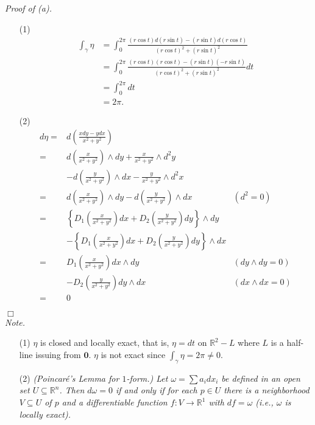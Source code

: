 \documentclass{article}
\begin{document}
\emph{Proof of (a).}
\begin{enumerate}
\item[(1)]
  \begin{align*}
    \int_{\gamma} \eta
    &= \int_{0}^{2\pi}
      \frac{(r\cos t) d(r\sin t) - (r\sin t) d(r\cos t)}{(r\cos t)^2 + (r\sin t)^2} \\
    &= \int_{0}^{2\pi}
      \frac{(r \cos t)(r \cos t) - (r\sin t) (-r\sin t)}{(r\cos t)^2 + (r\sin t)^2} dt \\
    &= \int_{0}^{2\pi} dt \\
    &= 2\pi.
  \end{align*}

\item[(2)]
  \begin{align*}
    d \eta
    =& d \left( \frac{x dy - y dx}{x^2+y^2} \right) \\
    =& d \left( \frac{x}{x^2+y^2} \right) \wedge dy
      + \frac{x}{x^2+y^2} \wedge {d^2y} \\
      &- d \left( \frac{y}{x^2+y^2} \right) \wedge dx
      - \frac{y}{x^2+y^2} \wedge {d^2x} \\
    =& d \left( \frac{x}{x^2+y^2} \right) \wedge dy
      - d \left( \frac{y}{x^2+y^2} \right) \wedge dx
      &(d^2 = 0) \\
    =& \left\{ D_1\left(\frac{x}{x^2+y^2}\right) dx
      + D_2\left(\frac{y}{x^2+y^2}\right) dy \right\} \wedge dy \\
      &- \left\{ D_1\left(\frac{x}{x^2+y^2}\right) dx
      + D_2\left(\frac{y}{x^2+y^2}\right) dy \right\} \wedge dx \\
    =& D_1\left(\frac{x}{x^2+y^2}\right) dx \wedge dy
      &(dy \wedge dy = 0) \\
      &- D_2\left(\frac{y}{x^2+y^2}\right) dy \wedge dx
      &(dx \wedge dx = 0) \\
    =& 0
  \end{align*}
\end{enumerate}
$\Box$ \\



\emph{Note.}
\begin{enumerate}
\item[(1)]
  $\eta$ is closed and locally exact, that is,
  $\eta = dt$ on $\mathbb{R}^2 - L$
  where $L$ is a half-line issuing from $\mathbf{0}$.
  $\eta$ is not exact since $\int_{\gamma} \eta = 2\pi \neq 0$.

\item[(2)]
  \emph{(Poincar\'e's Lemma for $1$-form.)
  Let $\omega = \sum a_i dx_i$ be defined in an open set $U \subseteq \mathbb{R}^n$.
  Then $d\omega = 0$ if and only if for each $p \in U$ there is a neighborhood $V \subseteq U$
  of $p$ and a differentiable function $f: V \to \mathbb{R}^1$ with
  $df = \omega$ (i.e., $\omega$ is locally exact).} \\
\end{enumerate}
\end{document}
